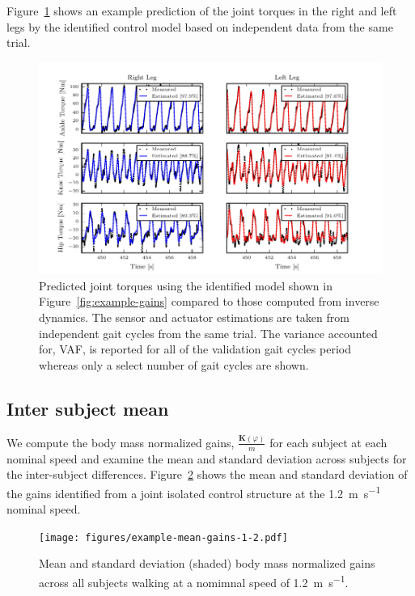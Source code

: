 \documentclass{article}
\begin{document}
Figure~\ref{fig:example-fit} shows an example prediction of the joint torques
in the right and left legs by the identified control model based on independent
data from the same trial. 
%
\begin{figure}
  \begin{center}
    \includegraphics{figures/example-identified-joint-isolated-fit.pdf}
    \caption{Predicted joint torques using the identified model shown in
      Figure~\ref{fig:example-gains} compared to those computed from inverse
      dynamics. The sensor and actuator estimations are taken from independent
      gait cycles from the same trial. The variance accounted for, VAF, is
      reported for all of the validation gait cycles period whereas only a select
      number of gait cycles are shown.}
    \label{fig:example-fit}
  \end{center}
\end{figure}

\subsection*{Inter subject mean}
%
We compute the body mass normalized gains, $\frac{\mathbf{K}(\varphi)}{m}$ for
each subject at each nominal speed and examine the mean and standard deviation
across subjects for the inter-subject differences.
Figure~\ref{fig:mean-gains-1-2} shows the mean and standard deviation of the
gains identified from a joint isolated control structure at the
1.2~\si{\meter\per\second} nominal speed.
%
\begin{figure}
  \begin{center}
    \texttt{[image: figures/example-mean-gains-1-2.pdf]}
    \caption{Mean and standard deviation (shaded) body mass normalized gains
      across all subjects walking at a nomimnal speed of
      1.2~\si{\meter\per\second}.}
    \label{fig:mean-gains-1-2}
  \end{center}
\end{figure}
\end{document}
